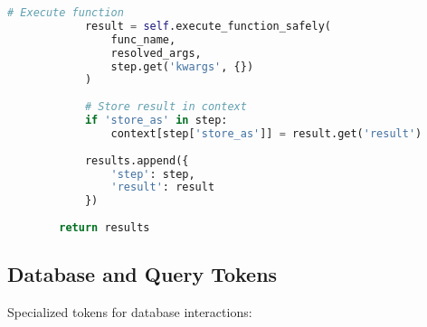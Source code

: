 \begin{lstlisting}[language=Python, caption=Function calling token system]
            # Execute function
            result = self.execute_function_safely(
                func_name,
                resolved_args,
                step.get('kwargs', {})
            )
            
            # Store result in context
            if 'store_as' in step:
                context[step['store_as']] = result.get('result')
            
            results.append({
                'step': step,
                'result': result
            })
        
        return results
\end{lstlisting}

\subsection{Database and Query Tokens}

Specialized tokens for database interactions:

